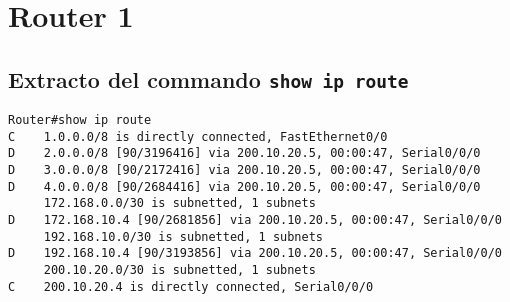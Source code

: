\documentclass[12pt, times]{simauth}
\begin{document}

\title{
    { \fontsize{30}{1} \selectfont{
        Laboratorio 3: Cálculo de EIGRP }
    }
}

\author{
    { \fontsize{14}{1} \selectfont{
        Profesor: Luis Carlos Loaiza Canet\\
        Priscilla Piedra Hidalgo y Carlos Martín Flores González\\
        23 de Setiembre del 2017
        }
    }
}

%


%
\maketitle

\tableofcontents

\section{Router 1}
\subsection{Extracto del commando \texttt{show ip route}}
\begin{verbatim}
Router#show ip route
C    1.0.0.0/8 is directly connected, FastEthernet0/0
D    2.0.0.0/8 [90/3196416] via 200.10.20.5, 00:00:47, Serial0/0/0
D    3.0.0.0/8 [90/2172416] via 200.10.20.5, 00:00:47, Serial0/0/0
D    4.0.0.0/8 [90/2684416] via 200.10.20.5, 00:00:47, Serial0/0/0
     172.168.0.0/30 is subnetted, 1 subnets
D    172.168.10.4 [90/2681856] via 200.10.20.5, 00:00:47, Serial0/0/0
     192.168.10.0/30 is subnetted, 1 subnets
D    192.168.10.4 [90/3193856] via 200.10.20.5, 00:00:47, Serial0/0/0
     200.10.20.0/30 is subnetted, 1 subnets
C    200.10.20.4 is directly connected, Serial0/0/0
\end{verbatim}
\end{document}
